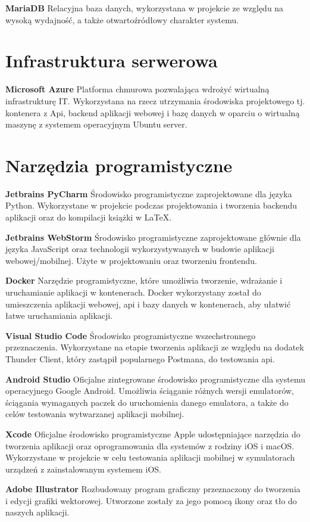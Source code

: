 \textbf{MariaDB} Relacyjna baza danych, wykorzystana w projekcie ze względu na
wysoką wydajność, a także otwartoźródłowy charakter systemu.

\section{Infrastruktura serwerowa}

\textbf{Microsoft Azure} Platforma chmurowa pozwalająca wdrożyć wirtualną infrastrukturę IT. Wykorzystana na rzecz utrzymania środowiska projektowego tj. kontenera z Api, backend aplikacji webowej i bazę danych w oparciu o wirtualną maszynę z systemem operacyjnym Ubuntu server.

\section{Narzędzia programistyczne}

\textbf{Jetbrains PyCharm} Środowisko programistyczne zaprojektowane dla języka Python. Wykorzystane w projekcie podczas projektowania i tworzenia backendu aplikacji oraz do kompilacji książki w LaTeX.

\medskip

\textbf{Jetbrains WebStorm} Środowisko programistyczne zaprojektowane głównie dla języka JavaScript oraz technologii wykorzystywanych w budowie aplikacji webowej/mobilnej. Użyte w projektowaniu oraz tworzeniu frontendu.

\medskip

\textbf{Docker} Narzędzie programistyczne, które umożliwia tworzenie, wdrażanie i uruchamianie aplikacji w kontenerach. Docker wykorzystany został do umieszczenia aplikacji webowej, api i bazy danych w kontenerach, aby ułatwić łatwe uruchamiania aplikacji.

\medskip

\textbf{Visual Studio Code} Środowisko programistyczne wszechstronnego przeznaczenia. Wykorzystane na etapie tworzenia aplikacji ze względu na dodatek Thunder Client, który zastąpił popularnego Postmana, do testowania api.

\medskip

\textbf{Android Studio} Oficjalne zintegrowane środowisko programistyczne dla systemu operacyjnego Google Android. Umożliwia ściąganie różnych wersji emulatorów, ściągania wymaganych paczek do uruchomienia danego emulatora, a także do celów testowania wytwarzanej aplikacji mobilnej.

\medskip

\textbf{Xcode} Oficjalne środowisko programistyczne Apple udostępniające narzędzia do tworzenia aplikacji oraz oprogramowania dla systemów z rodziny iOS i macOS. Wykorzystane w projekcie w celu testowania aplikacji mobilnej w symulatorach urządzeń z zainstalowanym systemem iOS.

\medskip

\textbf{Adobe Illustrator} Rozbudowany program graficzny przeznaczony do tworzenia i edycji grafiki wektorowej. Utworzone zostały za jego pomocą ikony oraz tło do naszych aplikacji.
